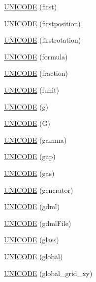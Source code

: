 \begin{DoxyCompactItemize}
\item 
\hyperlink{namespace_d_d4hep_1_1_x_m_l_ac80613f906cf63517d64418efa954e0a}{U\+N\+I\+C\+O\+DE} (first)
\item 
\hyperlink{namespace_d_d4hep_1_1_x_m_l_a791bf013a10eb51d4327337998549933}{U\+N\+I\+C\+O\+DE} (firstposition)
\item 
\hyperlink{namespace_d_d4hep_1_1_x_m_l_ab0b2ec7402a741cd3861fcda7ac070e7}{U\+N\+I\+C\+O\+DE} (firstrotation)
\item 
\hyperlink{namespace_d_d4hep_1_1_x_m_l_aacac9785fd2df652653df6b5d88ae188}{U\+N\+I\+C\+O\+DE} (formula)
\item 
\hyperlink{namespace_d_d4hep_1_1_x_m_l_af2a0921e72853c1f4486576ca5faa8c9}{U\+N\+I\+C\+O\+DE} (fraction)
\item 
\hyperlink{namespace_d_d4hep_1_1_x_m_l_ac7baee28e83ec35385467b2a43fcb315}{U\+N\+I\+C\+O\+DE} (funit)
\item 
\hyperlink{namespace_d_d4hep_1_1_x_m_l_a19db2e310efabcda642e944156397a3e}{U\+N\+I\+C\+O\+DE} (g)
\item 
\hyperlink{namespace_d_d4hep_1_1_x_m_l_a7e38c23f958dbd4dd72132258415089a}{U\+N\+I\+C\+O\+DE} (G)
\item 
\hyperlink{namespace_d_d4hep_1_1_x_m_l_a744d7ae136ffd3528f589a104752de4f}{U\+N\+I\+C\+O\+DE} (gamma)
\item 
\hyperlink{namespace_d_d4hep_1_1_x_m_l_aeafa1faf0f7298b41837dd9841fcaf63}{U\+N\+I\+C\+O\+DE} (gap)
\item 
\hyperlink{namespace_d_d4hep_1_1_x_m_l_a102278c6d3b1cfbcd3e483b11bd0c198}{U\+N\+I\+C\+O\+DE} (gas)
\item 
\hyperlink{namespace_d_d4hep_1_1_x_m_l_a21b2aa5d5d4e27c0c59ba7fab696f5b6}{U\+N\+I\+C\+O\+DE} (generator)
\item 
\hyperlink{namespace_d_d4hep_1_1_x_m_l_abed9c3c5916cb99ff3f6ffab1df6ab22}{U\+N\+I\+C\+O\+DE} (gdml)
\item 
\hyperlink{namespace_d_d4hep_1_1_x_m_l_ab1285488b0ccae0bab2f1c8fb7e77c28}{U\+N\+I\+C\+O\+DE} (gdml\+File)
\item 
\hyperlink{namespace_d_d4hep_1_1_x_m_l_a485b8ee2685bf8b06af49e131435affa}{U\+N\+I\+C\+O\+DE} (glass)
\item 
\hyperlink{namespace_d_d4hep_1_1_x_m_l_a8ed966ed38f2028ea807a52ec70fab6c}{U\+N\+I\+C\+O\+DE} (global)
\item 
\hyperlink{namespace_d_d4hep_1_1_x_m_l_af6d4ffc290b6e2dd3ef16118766f2fcf}{U\+N\+I\+C\+O\+DE} (global\+\_\+grid\+\_\+xy)
\item 

\end{DoxyCompactItemize}
